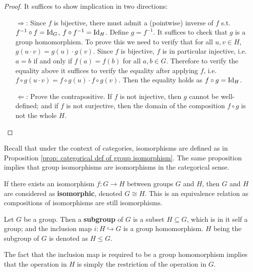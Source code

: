 \documentclass{article}
\begin{document}
\begin{proof}
    It suffices to show implication in two directions:
    \begin{enumerate}
        \item[$\Rightarrow$:] Since $f$ is bijective, there must admit a (pointwise) inverse of $f$ s.t. $f^{-1} \circ f = \mathrm{Id}_{G}$, $f \circ f^{-1} = \mathrm{Id}_H$. Define $g = f^{-1}$. It suffices to check that $g$ is a group homomorphism. To prove this we need to verify that for all $u, v \in H$, $g(u \cdot v) = g(u) \cdot g(v)$. Since $f$ is bijective, $f$ is in particular injective, i.e. $a = b$ if and only if $f(a) = f(b)$ for all $a, b \in G$. Therefore to verify the equality above it suffices to verify the equality after applying $f$, i.e. $f \circ g(u \cdot v) = f \circ g(u) \cdot f \circ g(v)$. Then the equality holds as $f \circ g = \mathrm{Id}_H$. 
        \item[$\Leftarrow$:] Prove the contrapositive. If $f$ is not injective, then $g$ cannot be well-defined; and if $f$ is not surjective, then the domain of the composition $f \circ g$ is not the whole $H$.
    \end{enumerate}
\end{proof}

\begin{remark}
    Recall that under the context of categories, isomorphisms are defined as in Proposition \ref{prop: categorical def of group isomorphism}. The same proposition implies that group isomorphisms are isomorphisms in the categorical sense. 
\end{remark}

\begin{remark}
    If there exists an isomorphism $f: G \to H$ between groups $G$ and $H$, then $G$ and $H$ are considered as \textbf{isomorphic}, denoted $G \cong H$. This is an equivalence relation as compositions of isomorphisms are still isomorphisms.
\end{remark}

\begin{definition}
    Let $G$ be a group. Then a \textbf{subgroup} of $G$ is a subset $H \subseteq G$, which is in it self a group; and the inclusion map $i: H \hookrightarrow G$ is a group homomorphism. $H$ being the subgroup of $G$ is denoted as $H \leq G$.
\end{definition}

\begin{remark}
    The fact that the inclusion map is required to be a group homomorphism implies that the operation in $H$ is simply the restriction of the operation in $G$.
\end{remark}
\end{document}
